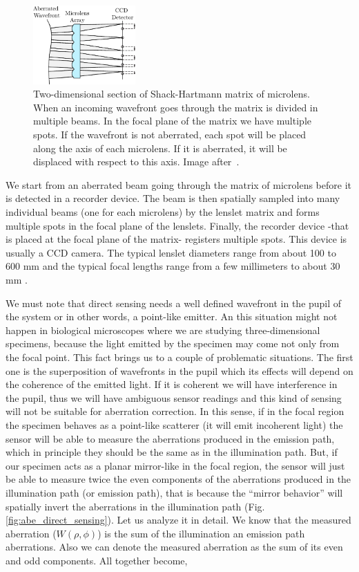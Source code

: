 \begin{figure}[htbp]
	\centering
		\includegraphics[width=0.35\textwidth]{images/SH}
	\caption{Two-dimensional section of Shack-Hartmann matrix of microlens. When an incoming wavefront goes through the matrix is divided in multiple beams. In the focal plane of the matrix we have multiple spots. If the wavefront is not aberrated, each spot will be placed along the axis of each microlens. If it is aberrated, it will be displaced with respect to this axis. Image after~\cite{optical_shop_testing}.}
	\label{fig:SH}
\end{figure}


We start from an aberrated beam going through the matrix of microlens before it is detected in a recorder device. The beam is then spatially sampled into many individual beams (one for each microlens) by the lenslet matrix and forms multiple spots in the focal plane of the lenslets. Finally, the recorder device -that is placed at the focal plane of the matrix- registers multiple spots. This device is usually a CCD camera. The typical lenslet diameters range from about 100 to 600 mm and the typical focal lengths range from a few millimeters to about 30 mm \cite{AO_vision_science}.
  
We must note that direct sensing needs a well defined wavefront in the pupil of the system or in other words, a point-like emitter. An this situation might not happen in biological microscopes where we are studying three-dimensional specimens, because the light emitted by the specimen may come not only from the focal point. This fact brings us to a couple of problematic situations. The first one is the superposition of wavefronts in the pupil which its effects will depend on the coherence of the emitted light. If it is coherent we will have interference in the pupil, thus we will have ambiguous sensor readings and this kind of sensing will not be suitable for aberration correction. In this sense, if in the focal region the specimen behaves as a point-like scatterer (it will emit incoherent light) the sensor will be able to measure the aberrations produced in the emission path, which in principle they should be the same as in the illumination path. But, if our specimen acts as a planar mirror-like in the focal region, the sensor will just be able to measure twice the even components of the aberrations produced in the illumination path (or emission path), that is because the "`mirror behavior"' will spatially invert the aberrations in the illumination path (Fig. \ref{fig:abe_direct_sensing}). Let us analyze it in detail. We know that the measured aberration ($W(\rho,\phi)$) is the sum of the illumination an emission path aberrations. Also we can denote the measured aberration as the sum of its even and odd components. All together become,  

